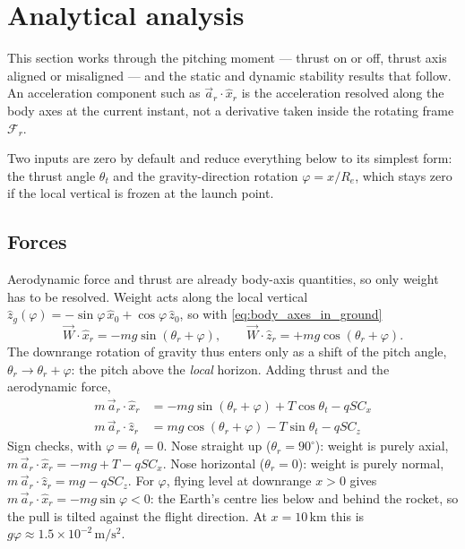 \section{Analytical analysis}\label{sec:analysis}
This section works through the pitching moment --- thrust on or off, thrust axis aligned or
misaligned --- and the static and dynamic stability results that follow. An acceleration component
such as $\vec{a}_r\cdot\hat{x}_r$ is the acceleration resolved along the body axes at the current
instant, not a derivative taken inside the rotating frame $\mathcal{F}_r$.

Two inputs are zero by default and reduce everything below to its simplest form: the thrust angle
$\theta_t$ and the gravity-direction rotation $\varphi=x/R_e$, which stays zero if the local
vertical is frozen at the launch point.

\subsection{Forces}\label{sec:analysis_forces}
Aerodynamic force and thrust are already body-axis quantities, so only weight has to be resolved.
Weight acts along the local vertical $\hat{z}_g(\varphi)=-\sin\varphi\,\hat{x}_0+\cos\varphi\,
\hat{z}_0$, so with \autoref{eq:body_axes_in_ground}
\begin{equation}
    \vec{W}\cdot\hat{x}_r = -mg\sin(\theta_r+\varphi), \qquad
    \vec{W}\cdot\hat{z}_r = +mg\cos(\theta_r+\varphi).
\end{equation}
The downrange rotation of gravity thus enters only as a shift of the pitch angle,
$\theta_r\to\theta_r+\varphi$: the pitch above the \emph{local} horizon. Adding thrust and the
aerodynamic force,
\begin{align}
    m\,\vec{a}_r\cdot\hat{x}_r &= -mg\sin(\theta_r+\varphi) + T\cos\theta_t - qSC_x \label{eq:analytic_force_x}\\
    m\,\vec{a}_r\cdot\hat{z}_r &= mg\cos(\theta_r+\varphi) - T\sin\theta_t - qSC_z \label{eq:analytic_force_z}
\end{align}
Sign checks, with $\varphi=\theta_t=0$. Nose straight up ($\theta_r=90^\circ$): weight is purely
axial, $m\,\vec{a}_r\cdot\hat{x}_r=-mg+T-qSC_x$. Nose horizontal ($\theta_r=0$): weight is purely
normal, $m\,\vec{a}_r\cdot\hat{z}_r=mg-qSC_z$. For $\varphi$, flying level at downrange $x>0$ gives
$m\,\vec{a}_r\cdot\hat{x}_r=-mg\sin\varphi<0$: the Earth's centre lies below and behind the
rocket, so the pull is tilted against the flight direction. At $x=10\,\mathrm{km}$ this is
$g\varphi\approx1.5\times10^{-2}\,\mathrm{m/s^2}$.

